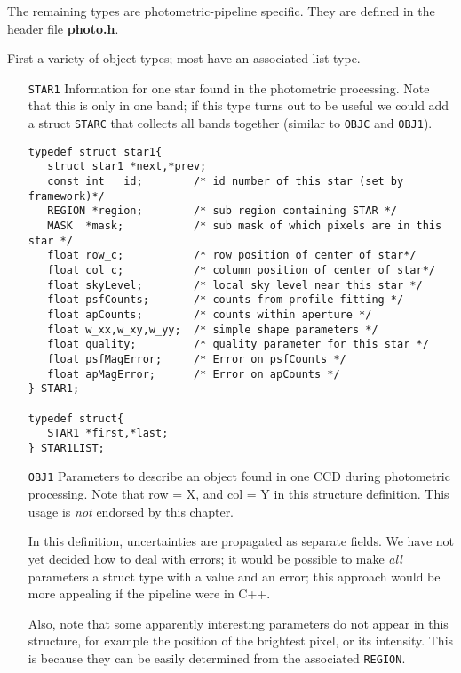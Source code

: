 {\begin{itemize}
\end{itemize}


The remaining types are photometric-pipeline specific. They are defined in the
header file {\bf photo.h}.

First a variety of object types; most have an associated list type.

\begin{itemize}

\item[{\tt STAR1}]
Information for one star found in the photometric processing. Note that
this is only in one band; if this type turns out to be useful we could
add a struct {\tt STARC} that collects all bands together (similar to
{\tt OBJC} and {\tt OBJ1}).

\begin{verbatim}
typedef struct star1{
   struct star1 *next,*prev;
   const int   id;        /* id number of this star (set by framework)*/
   REGION *region;        /* sub region containing STAR */
   MASK  *mask;           /* sub mask of which pixels are in this star */
   float row_c;           /* row position of center of star*/
   float col_c;           /* column position of center of star*/
   float skyLevel;        /* local sky level near this star */
   float psfCounts;       /* counts from profile fitting */
   float apCounts;        /* counts within aperture */
   float w_xx,w_xy,w_yy;  /* simple shape parameters */
   float quality;         /* quality parameter for this star */
   float psfMagError;     /* Error on psfCounts */
   float apMagError;      /* Error on apCounts */
} STAR1;

typedef struct{
   STAR1 *first,*last;
} STAR1LIST;
\end{verbatim}

\item[{\tt OBJ1}]
Parameters to describe an object found in one CCD during photometric
processing.
Note that row = X, and col = Y in this structure
definition. This usage is {\em not} endorsed by this chapter.

In this definition, uncertainties are propagated as separate fields. We
have not yet decided how to deal with errors; it would be possible to
make {\em all} parameters a struct type with a value and an error; this
approach would be more appealing if the pipeline were in C++.

Also, note that some apparently interesting parameters do not appear
in this structure, for example the position of the brightest pixel,
or its intensity. This is because they can be easily determined from
the associated {\tt REGION}.


\end{itemize}}
